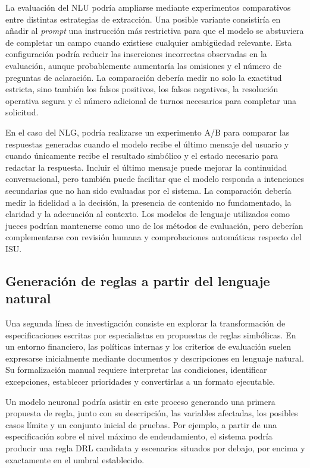 \documentclass[12pt,a4paper]{report}
\begin{document}
La evaluación del NLU podría ampliarse mediante experimentos comparativos entre distintas estrategias de extracción. Una posible variante consistiría en añadir al \textit{prompt} una instrucción más restrictiva para que el modelo se abstuviera de completar un campo cuando existiese cualquier ambigüedad relevante. Esta configuración podría reducir las inserciones incorrectas observadas en la evaluación, aunque probablemente aumentaría las omisiones y el número de preguntas de aclaración. La comparación debería medir no solo la exactitud estricta, sino también los falsos positivos, los falsos negativos, la resolución operativa segura y el número adicional de turnos necesarios para completar una solicitud.

En el caso del NLG, podría realizarse un experimento A/B para comparar las respuestas generadas cuando el modelo recibe el último mensaje del usuario y cuando únicamente recibe el resultado simbólico y el estado necesario para redactar la respuesta. Incluir el último mensaje puede mejorar la continuidad conversacional, pero también puede facilitar que el modelo responda a intenciones secundarias que no han sido evaluadas por el sistema. La comparación debería medir la fidelidad a la decisión, la presencia de contenido no fundamentado, la claridad y la adecuación al contexto. Los modelos de lenguaje utilizados como jueces podrían mantenerse como uno de los métodos de evaluación, pero deberían complementarse con revisión humana y comprobaciones automáticas respecto del ISU.

\subsection{Generación de reglas a partir del lenguaje natural}

Una segunda línea de investigación consiste en explorar la transformación de especificaciones escritas por especialistas en propuestas de reglas simbólicas. En un entorno financiero, las políticas internas y los criterios de evaluación suelen expresarse inicialmente mediante documentos y descripciones en lenguaje natural. Su formalización manual requiere interpretar las condiciones, identificar excepciones, establecer prioridades y convertirlas a un formato ejecutable.

Un modelo neuronal podría asistir en este proceso generando una primera propuesta de regla, junto con su descripción, las variables afectadas, los posibles casos límite y un conjunto inicial de pruebas. Por ejemplo, a partir de una especificación sobre el nivel máximo de endeudamiento, el sistema podría producir una regla DRL candidata y escenarios situados por debajo, por encima y exactamente en el umbral establecido.
\end{document}
